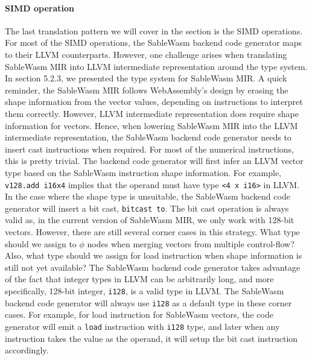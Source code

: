 \paragraph{SIMD operation}
The last translation pattern we will cover in the section is the SIMD
operations. For most of the SIMD operations, the SableWasm backend code
generator maps to their LLVM counterparts. However, one challenge arises when
translating SableWasm MIR into LLVM intermediate representation around the
type system. In section 5.2.3, we presented the type system for SableWasm MIR.
A quick reminder, the SableWasm MIR follows WebAssembly's design by erasing the
shape information from the vector values, depending on instructions to
interpret them correctly. However, LLVM intermediate representation does
require shape information for vectors. Hence, when lowering SableWasm MIR into
the LLVM intermediate representation, the SableWasm backend code generator needs
to insert cast instructions when required. For most of the numerical
instructions, this is pretty trivial. The backend code generator will first
infer an LLVM vector type based on the SableWasm instruction shape information.
For example, \texttt{v128.add i16x4} implies that the operand must have type
\texttt{<4 x i16>} in LLVM. In the case where the shape type is unsuitable,
the SableWasm backend code generator will insert a bit cast,
\texttt{bitcast to}. The bit cast operation is always valid as, in the current
version of SableWasm MIR, we only work with 128-bit vectors. However, there
are still several corner cases in this strategy. What type should we assign to
$\phi$ nodes when merging vectors from multiple control-flow? Also, what type
should we assign for load instruction when shape information is still not yet
available? The SableWasm backend code generator takes advantage of the fact
that integer types in LLVM can be arbitrarily long, and more specifically,
128-bit integer, \texttt{i128}, is a valid type in LLVM. The SableWasm backend
code generator will always use \texttt{i128} as a default type in these corner
cases. For example, for load instruction for SableWasm vectors, the code
generator will emit a \texttt{load} instruction with \texttt{i128} type, and
later when any instruction takes the value as the operand, it will setup the
bit cast instruction accordingly.